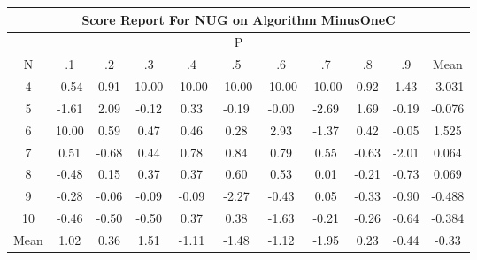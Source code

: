 \documentclass[11pt,a4paper]{report}
\begin{document}
\begin{longtable}{ | c || c | c | c | c | c | c | c | c | c || c |}
\hline
\multicolumn{11}{|c|}{ Score Report For NUG on Algorithm MinusOneC} \\
\hline
\multicolumn{11}{|c|}{ P } \\
\hline
N & .1 & .2 & .3 & .4 & .5 & .6 & .7 & .8 & .9 & Mean\\
 \hline
 \hline
 \endhead
  4 &  \cellcolor[HTML]{FFEFEF} -0.54 &  \cellcolor[HTML]{E7E7FF} 0.91 &  \cellcolor[HTML]{0808FF} 10.00 &  \cellcolor[HTML]{FF0000} -10.00 &  \cellcolor[HTML]{FF0000} -10.00 &  \cellcolor[HTML]{FF0000} -10.00 &  \cellcolor[HTML]{FF0000} -10.00 &  \cellcolor[HTML]{E7E7FF} 0.92 &  \cellcolor[HTML]{D7D7FF} 1.43 & -3.031 \\
  5 &  \cellcolor[HTML]{FFD7D7} -1.61 &  \cellcolor[HTML]{C7C7FF} 2.09 &  \cellcolor[HTML]{FFFFFF} -0.12 &  \cellcolor[HTML]{F7F7FF} 0.33 &  \cellcolor[HTML]{FFF7F7} -0.19 &  \cellcolor[HTML]{FFFFFF} -0.00 &  \cellcolor[HTML]{FFBFBF} -2.69 &  \cellcolor[HTML]{D7D7FF} 1.69 &  \cellcolor[HTML]{FFF7F7} -0.19 & -0.076 \\
  6 &  \cellcolor[HTML]{0808FF} 10.00 &  \cellcolor[HTML]{EFEFFF} 0.59 &  \cellcolor[HTML]{F7F7FF} 0.47 &  \cellcolor[HTML]{F7F7FF} 0.46 &  \cellcolor[HTML]{F7F7FF} 0.28 &  \cellcolor[HTML]{B7B7FF} 2.93 &  \cellcolor[HTML]{FFDFDF} -1.37 &  \cellcolor[HTML]{F7F7FF} 0.42 &  \cellcolor[HTML]{FFFFFF} -0.05 & 1.525 \\
  7 &  \cellcolor[HTML]{EFEFFF} 0.51 &  \cellcolor[HTML]{FFEFEF} -0.68 &  \cellcolor[HTML]{F7F7FF} 0.44 &  \cellcolor[HTML]{EFEFFF} 0.78 &  \cellcolor[HTML]{E7E7FF} 0.84 &  \cellcolor[HTML]{EFEFFF} 0.79 &  \cellcolor[HTML]{EFEFFF} 0.55 &  \cellcolor[HTML]{FFEFEF} -0.63 &  \cellcolor[HTML]{FFCFCF} -2.01 & 0.064 \\
  8 &  \cellcolor[HTML]{FFEFEF} -0.48 &  \cellcolor[HTML]{FFFFFF} 0.15 &  \cellcolor[HTML]{F7F7FF} 0.37 &  \cellcolor[HTML]{F7F7FF} 0.37 &  \cellcolor[HTML]{EFEFFF} 0.60 &  \cellcolor[HTML]{EFEFFF} 0.53 &  \cellcolor[HTML]{FFFFFF} 0.01 &  \cellcolor[HTML]{FFF7F7} -0.21 &  \cellcolor[HTML]{FFEFEF} -0.73 & 0.069 \\
  9 &  \cellcolor[HTML]{FFF7F7} -0.28 &  \cellcolor[HTML]{FFFFFF} -0.06 &  \cellcolor[HTML]{FFFFFF} -0.09 &  \cellcolor[HTML]{FFFFFF} -0.09 &  \cellcolor[HTML]{FFC7C7} -2.27 &  \cellcolor[HTML]{FFF7F7} -0.43 &  \cellcolor[HTML]{FFFFFF} 0.05 &  \cellcolor[HTML]{FFF7F7} -0.33 &  \cellcolor[HTML]{FFE7E7} -0.90 & -0.488 \\
  10 &  \cellcolor[HTML]{FFF7F7} -0.46 &  \cellcolor[HTML]{FFEFEF} -0.50 &  \cellcolor[HTML]{FFEFEF} -0.50 &  \cellcolor[HTML]{F7F7FF} 0.37 &  \cellcolor[HTML]{F7F7FF} 0.38 &  \cellcolor[HTML]{FFD7D7} -1.63 &  \cellcolor[HTML]{FFF7F7} -0.21 &  \cellcolor[HTML]{FFF7F7} -0.26 &  \cellcolor[HTML]{FFEFEF} -0.64 & -0.384 \\
 \hline
 \hline
Mean &  \cellcolor[HTML]{E7E7FF} 1.02 &  \cellcolor[HTML]{F7F7FF} 0.36 &  \cellcolor[HTML]{D7D7FF} 1.51 &  \cellcolor[HTML]{FFDFDF} -1.11 &  \cellcolor[HTML]{FFD7D7} -1.48 &  \cellcolor[HTML]{FFDFDF} -1.12 &  \cellcolor[HTML]{FFCFCF} -1.95 &  \cellcolor[HTML]{F7F7FF} 0.23 &  \cellcolor[HTML]{FFF7F7} -0.44 &  \cellcolor[HTML]{FFF7F7} -0.33
\end{longtable}
\end{document}
